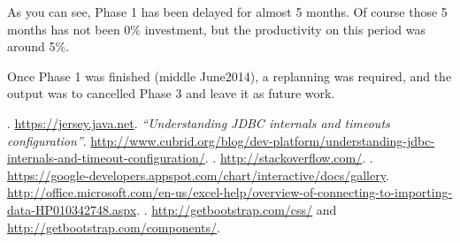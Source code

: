 \documentclass[a4paper,12pt,english]{book}
\begin{document}
As you can see, Phase 1 has been delayed for almost 5 months. Of course those 5
months has not been 0\% investment, but the productivity on this period was
around 5\%.

Once Phase 1 was finished (middle June\/2014), a replanning was required, and
the output was to cancelled Phase 3 and leave it as future work.

%
%




\cleardoublepage
{}
{}
\begin{thebibliography}{1}

	. \url{https://jersey.java.net}.
	\bibitem{}{} 
		{\em ``Understanding JDBC internals and timeouts configuration''}.
		\url{http://www.cubrid.org/blog/dev-platform/understanding-jdbc-internals-and-timeout-configuration/}.
	. \url{http://stackoverflow.com/}.
	.
	\url{https://google-developers.appspot.com/chart/interactive/docs/gallery}.
	\url{http://office.microsoft.com/en-us/excel-help/overview-of-connecting-to-importing-data-HP010342748.aspx}.
	. \url{http://getbootstrap.com/css/}
	and \url{http://getbootstrap.com/components/}.
\end{thebibliography}
\end{document}
